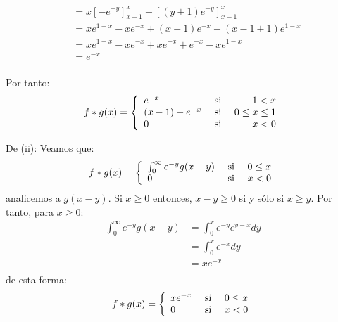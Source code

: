 \documentclass[12pt]{report}
\theoremstyle{largebreak}
\begin{document}
\begin{sol}
\begin{itemize}
\begin{equation*}
\begin{split}
                    &=x\left[-e^{-y} \right]_{x-1}^x+\left[(y+1)e^{-y}\right]_{x-1}^x \\
                    &=xe^{1-x}-xe^{-x}+(x+1)e^{-x}-(x-1+1)e^{1-x}\\
                    &=xe^{1-x}-xe^{-x}+xe^{-x}+e^{-x}-xe^{1-x}\\
                    &=e^{-x}\\
                \end{split}
            \end{equation*}
        \end{itemize}
        Por tanto:
        \begin{equation*}
            f*g(x)=\left\{
                \begin{array}{lcr}
                    e^{-x} & \textup{ si } & 1<x \\
                    (x-1)+e^{-x} & \textup{ si } & 0\leq x \leq1 \\
                    0 & \textup{ si } & x<0\\ 
                \end{array}
            \right.
        \end{equation*}

        De (ii): Veamos que:
        \begin{equation*}
            f*g(x)=\left\{
                \begin{array}{lcr}
                    \int_0^\infty e^{-y}g(x-y) & \textup{ si } & 0\leq x \\
                    0 & \textup{ si } & x<0\\ 
                \end{array}
            \right.
        \end{equation*}
        analicemos a $g(x-y)$. Si $x\geq 0$ entonces, $x-y\geq 0$ si y sólo si $x\geq y$. Por tanto, para $x\geq 0$:
        \begin{equation*}
            \begin{split}
                \int_0^\infty e^{-y}g(x-y)&=\int_0^x e^{-y}e^{y-x}dy\\
                &=\int_0^x e^{-x}dy\\
                &=xe^{-x}\\
            \end{split}
        \end{equation*}
        de esta forma:
        \begin{equation*}
            f*g(x)=\left\{
                \begin{array}{lcr}
                    xe^{-x} & \textup{ si } & 0\leq x \\
                    0 & \textup{ si } & x<0\\ 
                \end{array}
            \right.
        \end{equation*}


\end{sol}
\end{document}
